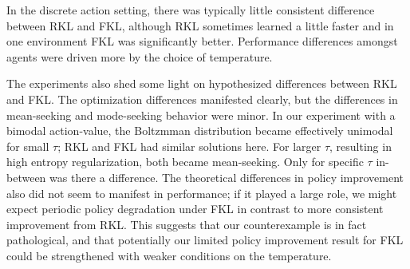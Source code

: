 \documentclass{article}
\begin{document}
In the discrete action setting, there was typically little consistent difference between RKL and FKL, although RKL sometimes learned a little faster and in one environment FKL was significantly better. Performance differences amongst agents were driven more by the choice of temperature. 

The experiments also shed some light on hypothesized differences between RKL and FKL. The optimization differences manifested clearly, but the differences in mean-seeking and mode-seeking behavior were minor. In our experiment with a bimodal action-value, the Boltzmman distribution became effectively unimodal for small $\tau$; RKL and FKL had similar solutions here. For larger $\tau$, resulting in high entropy regularization, both became mean-seeking. Only for specific $\tau$ in-between was there a difference. The theoretical differences in policy improvement also did not seem to manifest in performance; if it played a large role, we might expect periodic policy degradation under FKL in contrast to more consistent improvement from RKL. This suggests that our counterexample is in fact pathological, and that potentially our limited policy improvement result for FKL could be strengthened with weaker conditions on the temperature.

%
\end{document}
